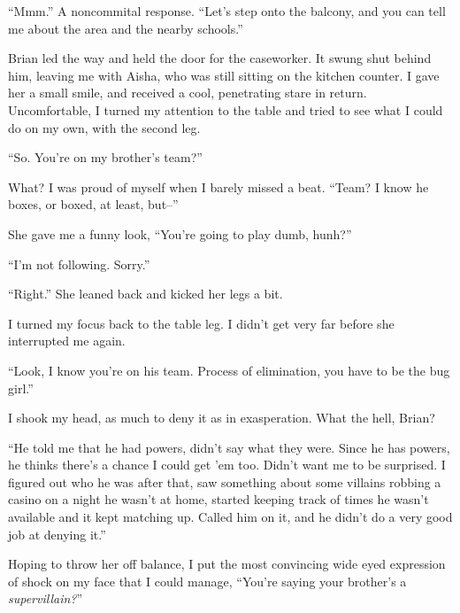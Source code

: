 ``Mmm.''  A noncommital response.  ``Let's step onto the balcony, and you can tell me about the area and the nearby schools.''



Brian led the way and held the door for the caseworker.  It swung shut behind him, leaving me with Aisha, who was still sitting on the kitchen counter.  I gave her a small smile, and received a cool, penetrating stare in return.  Uncomfortable, I turned my attention to the table and tried to see what I could do on my own, with the second leg.



``So.  You're on my brother's team?''



What?  I was proud of myself when I barely missed a beat.  ``Team?  I know he boxes, or boxed, at least, but--''



She gave me a funny look, ``You're going to play dumb, hunh?''



``I'm not following.  Sorry.''



``Right.''  She leaned back and kicked her legs a bit.



I turned my focus back to the table leg.  I didn't get very far before she interrupted me again.



``Look, I know you're on his team.  Process of elimination, you have to be the bug girl.''



I shook my head, as much to deny it as in exasperation.  What the hell, Brian?



``He told me that he had powers, didn't say what they were.  Since he has powers, he thinks there's a chance I could get 'em too.  Didn't want me to be surprised.  I figured out who he was after that, saw something about some villains robbing a casino on a night he wasn't at home, started keeping track of times he wasn't available and it kept matching up.  Called him on it, and he didn't do a very good job at denying it.''



Hoping to throw her off balance, I put the most convincing wide eyed expression of shock on my face that I could manage, ``You're saying your brother's a \emph{supervillain?}''



